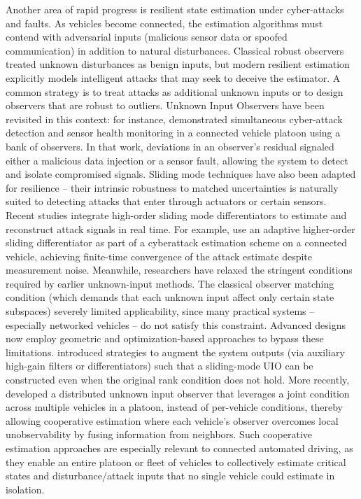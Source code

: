 Another area of rapid progress is resilient state estimation under cyber-attacks and faults. As vehicles become connected, the estimation algorithms must contend with adversarial inputs (malicious sensor data or spoofed communication) in addition to natural disturbances. Classical robust observers treated unknown disturbances as benign inputs, but modern resilient estimation explicitly models intelligent attacks that may seek to deceive the estimator. A common strategy is to treat attacks as additional unknown inputs or to design observers that are robust to outliers. Unknown Input Observers have been revisited in this context: for instance, \cite{jeon2020simultaneous} demonstrated simultaneous cyber-attack detection and sensor health monitoring in a connected vehicle platoon using a bank of observers. In that work, deviations in an observer’s residual signaled either a malicious data injection or a sensor fault, allowing the system to detect and isolate compromised signals. Sliding mode techniques have also been adapted for resilience – their intrinsic robustness to matched uncertainties is naturally suited to detecting attacks that enter through actuators or certain sensors. Recent studies integrate high-order sliding mode differentiators to estimate and reconstruct attack signals in real time. For example, \cite{SadkiSliding} use an adaptive higher-order sliding differentiator as part of a cyberattack estimation scheme on a connected vehicle, achieving finite-time convergence of the attack estimate despite measurement noise. Meanwhile, researchers have relaxed the stringent conditions required by earlier unknown-input methods. The classical observer matching condition (which demands that each unknown input affect only certain state subspaces) severely limited applicability, since many practical systems – especially networked vehicles – do not satisfy this constraint. Advanced designs now employ geometric and optimization-based approaches to bypass these limitations. \cite{KALSI2010347} introduced strategies to augment the system outputs (via auxiliary high-gain filters or differentiators) such that a sliding-mode UIO can be constructed even when the original rank condition does not hold. More recently, \cite{zhao2025distributedunknowninputobserver} developed a distributed unknown input observer that leverages a joint condition across multiple vehicles in a platoon, instead of per-vehicle conditions, thereby allowing cooperative estimation where each vehicle’s observer overcomes local unobservability by fusing information from neighbors. Such cooperative estimation approaches are especially relevant to connected automated driving, as they enable an entire platoon or fleet of vehicles to collectively estimate critical states and disturbance/attack inputs that no single vehicle could estimate in isolation.

